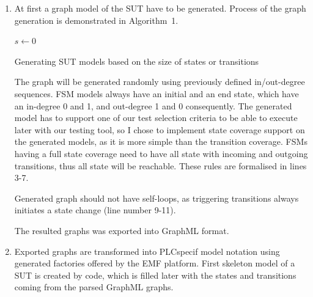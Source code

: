 \begin{enumerate}
	\item At first a graph model of the SUT have to be generated. Process of the graph generation is demonstrated in Algorithm~1.
	
\begin{algorithm}
\label{alg:sutmodelgeneration}
\SetAlgoLined
{}
$s \leftarrow 0$\;
\caption{Generating SUT models based on the size of states or transitions}
\end{algorithm}

	The graph will be generated randomly using previously defined in/out-degree sequences. FSM models always have an initial and an end state, which have an in-degree 0 and 1, and out-degree 1 and 0 consequently. The generated model has to support one of our test selection criteria to be able to execute later with our testing tool, so I chose to implement state coverage support on the generated models, as it is more simple than the transition coverage. FSMs having a full state coverage need to have all state with incoming and outgoing transitions, thus all state will be reachable. These rules are formalised in lines 3-7.
	
	Generated graph should not have self-loops, as triggering transitions always initiates a state change (line number 9-11).
	
	The resulted graphs was exported into GraphML format.
	
	\item  Exported graphs are transformed into PLCspecif model notation using generated factories offered by the EMF platform. First skeleton model of a SUT is created by code, which is filled later with the states and transitions coming from the parsed GraphML graphs.
	
\end{enumerate}

